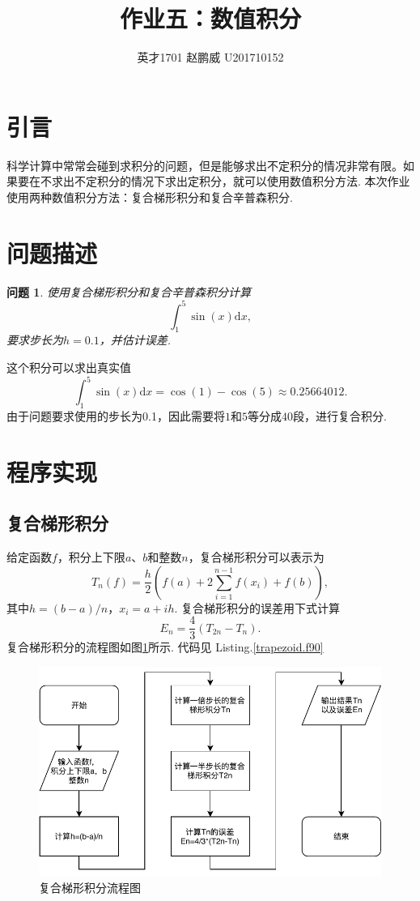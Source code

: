 \documentclass{article}
\title{作业五：数值积分}
\author{英才1701 赵鹏威 U201710152}
\newtheorem{task}{问题}
\begin{document}
	\maketitle
	\tableofcontents
	\section{引言}
	科学计算中常常会碰到求积分的问题，但是能够求出不定积分的情况非常有限。如果要在不求出不定积分的情况下求出定积分，就可以使用数值积分方法. 本次作业使用两种数值积分方法：复合梯形积分和复合辛普森积分.
	
	\section{问题描述}
	\begin{task}
		使用复合梯形积分和复合辛普森积分计算
		\[
		\int_1^5\sin(x)\mathrm{d}x,
		\]
		要求步长为$h=0.1$，并估计误差.
	\end{task}
	这个积分可以求出真实值
	\[
	\int_1^5\sin(x)\mathrm{d}x=\cos(1)-\cos(5)\approx0.25664012.
	\]
	由于问题要求使用的步长为0.1，因此需要将$1$和$5$等分成$40$段，进行复合积分.
	
	\section{程序实现}
	\subsection{复合梯形积分}
	给定函数$f$，积分上下限$a$、$b$和整数$n$，复合梯形积分可以表示为
	\[
	T_n(f)=\frac{h}{2}\left(f(a)+2 \sum_{i=1}^{n-1} f\left(x_{i}\right)+f(b)\right),
	\]
	其中$h=(b-a)/n$，$x_i=a+ih$. 复合梯形积分的误差用下式计算
	\[
	E_n=\frac{4}{3}(T_{2n}-T_{n}).
	\]
	复合梯形积分的流程图如图\ref{fig:trapezoid}所示. 代码见 Listing.\ref{trapezoid.f90}
	\begin{figure}[h!tb]
		\centering
		\includegraphics[width=1.0\textwidth]{./utils/trapezoid.pdf}
		\caption{ 复合梯形积分流程图\label{fig:trapezoid}}
	\end{figure}
	
	
\end{document}
